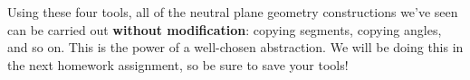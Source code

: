 \documentclass{article}
\begin{document}
Using these four tools, all of the neutral plane geometry constructions we've seen can be carried out \textbf{without modification}: copying segments, copying angles, and so on. This is the power of a well-chosen abstraction. We will be doing this in the next homework assignment, so be sure to save your tools!
\end{document}
